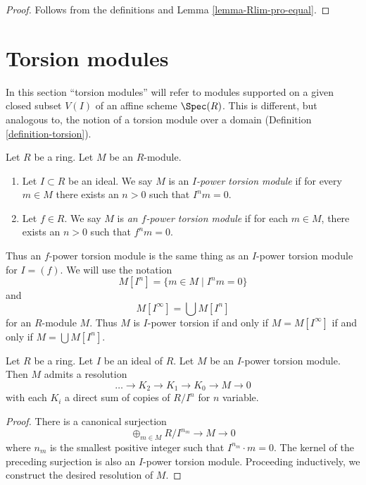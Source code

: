 \begin{proof}
Follows from the definitions and Lemma \ref{lemma-Rlim-pro-equal}.
\end{proof}








\section{Torsion modules}
\label{section-torsion}

\noindent
In this section ``torsion modules'' will refer to modules supported
on a given closed subset $V(I)$ of an affine scheme $\Spec(R)$.
This is different, but analogous to, the notion of a torsion module
over a domain (Definition \ref{definition-torsion}).

\begin{definition}
\label{definition-f-power-torsion}
Let $R$ be a ring. Let $M$ be an $R$-module.
\begin{enumerate}
\item Let $I \subset R$ be an ideal. We say $M$ is an
{\it $I$-power torsion module} if for every $m \in M$ there exists an $n > 0$
such that $I^n m = 0$.
\item Let $f \in R$. We say $M$ is
{\it an $f$-power torsion module} if for each
$m \in M$, there exists an $n > 0$ such that $f^n m = 0$.
\end{enumerate}
\end{definition}

\noindent
Thus an $f$-power torsion module is the same thing as an $I$-power torsion
module for $I = (f)$. We will use the notation
$$
M[I^n] = \{m \in M \mid I^nm = 0\}
$$
and
$$
M[I^\infty] = \bigcup M[I^n]
$$
for an $R$-module $M$. Thus $M$ is $I$-power torsion if and only if
$M = M[I^\infty]$ if and only if $M = \bigcup M[I^n]$.

\begin{lemma}
\label{lemma-I-power-torsion-presentation}
Let $R$ be a ring.
Let $I$ be an ideal of $R$.
Let $M$ be an $I$-power torsion module.
Then $M$ admits a resolution
$$
\ldots \to K_2 \to K_1 \to K_0 \to M \to 0
$$
with each $K_i$ a direct sum of copies of $R/I^n$ for $n$ variable.
\end{lemma}

\begin{proof}
There is a canonical surjection
$$
\oplus_{m \in M} R/I^{n_m} \to M \to 0
$$
where $n_m$ is the smallest positive integer such that $I^{n_m} \cdot m = 0$.
The kernel of the preceding surjection is also an $I$-power torsion module.
Proceeding inductively, we construct the desired resolution of $M$.
\end{proof}

